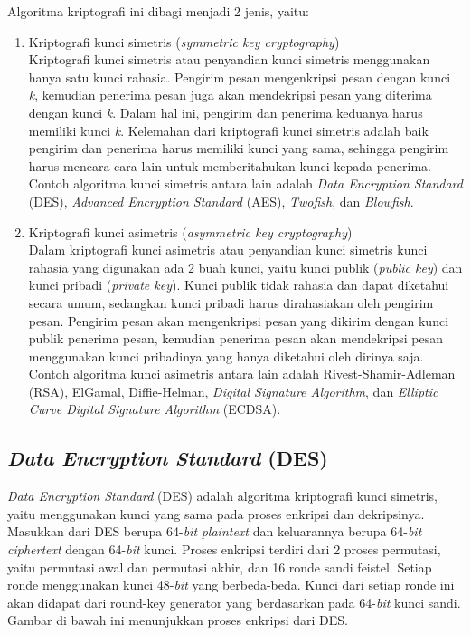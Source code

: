 Algoritma kriptografi ini dibagi menjadi 2 jenis, yaitu:
\begin{enumerate}
	\item Kriptografi kunci simetris (\textit{symmetric key cryptography})\\
		Kriptografi kunci simetris atau penyandian kunci simetris menggunakan hanya satu kunci rahasia. Pengirim pesan mengenkripsi pesan dengan kunci \textit{k}, kemudian penerima pesan juga akan mendekripsi pesan yang diterima dengan kunci \textit{k}. Dalam hal ini, pengirim dan penerima keduanya harus memiliki kunci \textit{k}. Kelemahan dari kriptografi kunci simetris adalah baik pengirim dan penerima harus memiliki kunci yang sama, sehingga pengirim harus mencara cara lain untuk memberitahukan kunci kepada penerima. Contoh algoritma kunci simetris antara lain adalah \textit{Data Encryption Standard} (DES), \textit{Advanced Encryption Standard} (AES), \textit{Twofish}, dan \textit{Blowfish}.
	\item Kriptografi kunci asimetris (\textit{asymmetric key cryptography})\\
	Dalam kriptografi kunci asimetris atau penyandian kunci simetris kunci rahasia yang digunakan ada 2 buah kunci, yaitu kunci publik (\textit{public key}) dan kunci pribadi (\textit{private key}). Kunci publik tidak rahasia dan dapat diketahui secara umum, sedangkan kunci pribadi harus dirahasiakan oleh pengirim pesan. Pengirim pesan akan mengenkripsi pesan yang dikirim dengan kunci publik penerima pesan, kemudian penerima pesan akan mendekripsi pesan menggunakan kunci pribadinya yang hanya diketahui oleh dirinya saja. Contoh algoritma kunci asimetris antara lain adalah Rivest-Shamir-Adleman (RSA), ElGamal, Diffie-Helman, \textit{Digital Signature Algorithm}, dan \textit{Elliptic Curve Digital Signature Algorithm} (ECDSA).
\end{enumerate}

\subsection{\textit{Data Encryption Standard} (DES)}
\textit{Data Encryption Standard} (DES) adalah algoritma kriptografi kunci simetris, yaitu menggunakan kunci yang sama pada proses enkripsi dan dekripsinya. Masukkan dari DES berupa 64-\textit{bit} \textit{plaintext} dan keluarannya berupa 64-\textit{bit} \textit{ciphertext} dengan 64-\textit{bit} kunci. Proses enkripsi terdiri dari 2 proses permutasi, yaitu permutasi awal dan permutasi akhir, dan 16 ronde sandi feistel. Setiap ronde menggunakan kunci 48-\textit{bit} yang berbeda-beda. Kunci dari setiap ronde ini akan didapat dari round-key generator yang berdasarkan pada 64-\textit{bit} kunci sandi. Gambar di bawah ini menunjukkan proses enkripsi dari DES.

